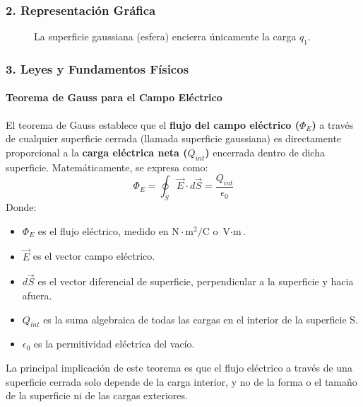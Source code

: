 \subsubsection*{2. Representación Gráfica}
\begin{figure}[H]
    \centering
    \caption{La superficie gaussiana (esfera) encierra únicamente la carga $q_1$.}
\end{figure}

\subsubsection*{3. Leyes y Fundamentos Físicos}
\paragraph*{Teorema de Gauss para el Campo Eléctrico}
El teorema de Gauss establece que el \textbf{flujo del campo eléctrico ($\Phi_E$)} a través de cualquier superficie cerrada (llamada superficie gaussiana) es directamente proporcional a la \textbf{carga eléctrica neta ($Q_{int}$)} encerrada dentro de dicha superficie.
Matemáticamente, se expresa como:
$$ \Phi_E = \oint_S \vec{E} \cdot d\vec{S} = \frac{Q_{int}}{\epsilon_0} $$
Donde:
\begin{itemize}
    \item $\Phi_E$ es el flujo eléctrico, medido en $\text{N}\cdot\text{m}^2/\text{C}$ o $\text{V}\cdot\text{m}$.
    \item $\vec{E}$ es el vector campo eléctrico.
    \item $d\vec{S}$ es el vector diferencial de superficie, perpendicular a la superficie y hacia afuera.
    \item $Q_{int}$ es la suma algebraica de todas las cargas en el interior de la superficie S.
    \item $\epsilon_0$ es la permitividad eléctrica del vacío.
\end{itemize}
La principal implicación de este teorema es que el flujo eléctrico a través de una superficie cerrada solo depende de la carga interior, y no de la forma o el tamaño de la superficie ni de las cargas exteriores.

